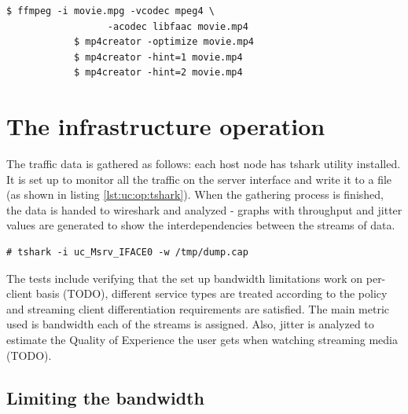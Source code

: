 \documentclass[11pt]{book}
\begin{document}
        \noindent
        \begin{minipage}{\textwidth}
          \begin{lstlisting}[caption={Media preparation before streaming},label={lst:uc:media:prep}]
            $ ffmpeg -i movie.mpg -vcodec mpeg4 \
                  -acodec libfaac movie.mp4
            $ mp4creator -optimize movie.mp4
            $ mp4creator -hint=1 movie.mp4
            $ mp4creator -hint=2 movie.mp4
          \end{lstlisting}
        \end{minipage}


    \section{The infrastructure operation}
    \label{sec:uc:operation}

      The traffic data is gathered as follows: each host node has tshark utility installed. It is set up to monitor all
      the traffic on the server interface and write it to a file (as shown in listing \ref{lst:uc:op:tshark}). When the
      gathering process is finished, the data is handed to wireshark and analyzed - graphs with throughput and jitter
      values are generated to show the interdependencies between the streams of data. \\

      \noindent
      \begin{minipage}{\textwidth}
        \begin{lstlisting}[caption={Monitoring network traffic with tshark},label={lst:uc:op:tshark}]
          # tshark -i uc_Msrv_IFACE0 -w /tmp/dump.cap
        \end{lstlisting}
      \end{minipage}

      The tests include verifying that the set up bandwidth limitations work on per-client basis (TODO), different
      service types are treated according to the policy and streaming client differentiation requirements are satisfied.
      The main metric used is bandwidth each of the streams is assigned. Also, jitter is analyzed to estimate the
      Quality of Experience the user gets when watching streaming media (TODO).


      \subsection{Limiting the bandwidth}
      \label{sub:uc:limit}
\end{document}
